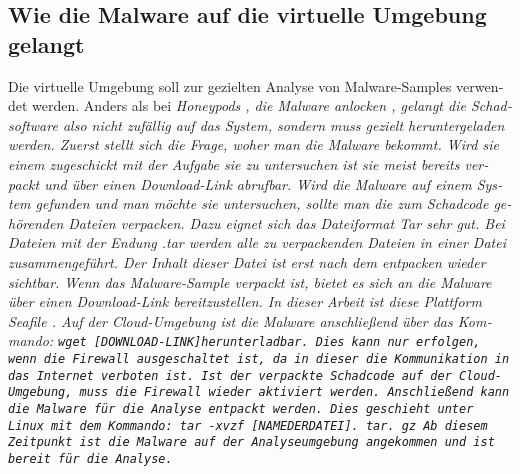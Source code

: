 \begin{otherlanguage}{ngerman}
\subsection{Wie die Malware auf die virtuelle Umgebung gelangt}
Die virtuelle Umgebung soll zur gezielten Analyse von Malware-Samples verwendet werden. Anders als bei \it Honeypods \rm, die Malware \dq anlocken \dq{}, gelangt die Schadsoftware also nicht zufällig auf das System, sondern muss gezielt heruntergeladen werden. 
\newline
Zuerst stellt sich die Frage, woher man die Malware bekommt. Wird sie einem zugeschickt mit der Aufgabe sie zu untersuchen ist sie meist bereits verpackt und über einen Download-Link abrufbar. Wird die Malware auf einem System gefunden und man möchte sie untersuchen, sollte man die zum Schadcode gehörenden Dateien verpacken. Dazu eignet sich das Dateiformat \dq Tar \dq{} sehr gut. Bei Dateien mit der Endung \dq .tar \dq{} werden alle zu verpackenden Dateien in einer Datei zusammengeführt. Der Inhalt dieser Datei ist erst nach dem entpacken wieder sichtbar. 
\newline
Wenn das Malware-Sample verpackt ist, bietet es sich an die Malware über einen Download-Link bereitzustellen. In dieser Arbeit ist diese Plattform \dq Seafile \dq. Auf der Cloud-Umgebung ist die Malware anschließend über das Kommando: \newline \tt wget [DOWNLOAD-LINK]\rm \newline herunterladbar. Dies kann nur erfolgen, wenn die Firewall ausgeschaltet ist, da in dieser die Kommunikation in das Internet verboten ist. Ist der verpackte Schadcode auf der Cloud-Umgebung, muss die Firewall wieder aktiviert werden. Anschließend kann die Malware für die Analyse entpackt werden. Dies geschieht unter Linux mit dem Kommando: \newline \tt tar -xvzf [NAMEDERDATEI]. tar. gz \rm \newline
Ab diesem Zeitpunkt ist die Malware auf der Analyseumgebung angekommen und ist bereit für die Analyse.
\newpage
\end{otherlanguage}